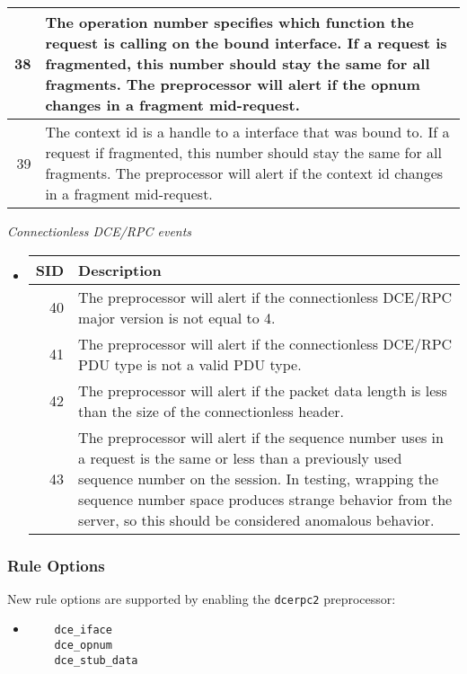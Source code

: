 \documentclass[english]{report}
\begin{document}
\begin{itemize}
\begin{longtable}[h]{|r|p{13.5cm}|}
\hline
 38 & The operation number specifies which function the request is calling on
      the bound interface. If a request is fragmented, this number should stay
      the same for all fragments.  The preprocessor will alert if the opnum
      changes in a fragment mid-request.\\
\hline
 39 & The context id is a handle to a interface that was bound to. If a
      request if fragmented, this number should stay the same for all
      fragments. The preprocessor will alert if the context id changes in a
      fragment mid-request.\\
\hline
\end{longtable}
\end{itemize}

\textit{Connectionless DCE/RPC events}
\begin{itemize}
\item[]
\begin{longtable}{|r|p{13.5cm}|}
\hline
SID & Description\\
\hline
\hline
 40 & The preprocessor will alert if the connectionless DCE/RPC major version
      is not equal to 4.\\
\hline
 41 & The preprocessor will alert if the connectionless DCE/RPC PDU type is
      not a valid PDU type.\\
\hline
 42 & The preprocessor will alert if the packet data length is less than the
      size of the connectionless header.\\
\hline
 43 & The preprocessor will alert if the sequence number uses in a request is
      the same or less than a previously used sequence number on the session.
      In testing, wrapping the sequence number space produces strange behavior
      from the server, so this should be considered anomalous behavior.\\
\hline
\end{longtable}
\end{itemize}

\subsubsection{Rule Options}

New rule options are supported by enabling the \texttt{dcerpc2} preprocessor:

\begin{itemize}
\item[]
\begin{verbatim}
    dce_iface
    dce_opnum
    dce_stub_data
\end{verbatim}
\end{itemize}
\end{document}
